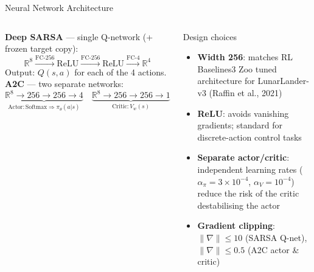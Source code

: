 \documentclass[aspectratio=169, 10pt]{beamer}
\begin{document}
\begin{frame}{Neural Network Architecture}
  \begin{columns}[T]
      \textbf{Deep SARSA} --- single Q-network (+ frozen target copy):
      \[
        \mathbb{R}^8 \xrightarrow{\text{FC-256}} \text{ReLU}
        \xrightarrow{\text{FC-256}} \text{ReLU}
        \xrightarrow{\text{FC-4}} \mathbb{R}^4
      \]
      Output: $Q(s, a)$ for each of the 4 actions.\\[0.8em]
      \textbf{A2C} --- two separate networks:
      \[
        \underbrace{\mathbb{R}^8 \!\to\! 256 \!\to\! 256 \!\to\! 4}_{\text{Actor}: \text{Softmax} \Rightarrow \pi_\theta(a|s)}
        \quad
        \underbrace{\mathbb{R}^8 \!\to\! 256 \!\to\! 256 \!\to\! 1}_{\text{Critic}: V_w(s)}
      \]
      \begin{block}{Design choices}
        \begin{itemize}
          \item \textbf{Width 256}: matches RL Baselines3 Zoo tuned
                architecture for LunarLander-v3 (Raffin et al., 2021)
          \item \textbf{ReLU}: avoids vanishing gradients; standard
                for discrete-action control tasks
          \item \textbf{Separate actor/critic}: independent learning
                rates ($\alpha_\pi = 3{\times}10^{-4}$,
                $\alpha_V = 10^{-4}$) reduce the risk of the critic
                destabilising the actor
          \item \textbf{Gradient clipping}: $\|\nabla\| \leq 10$
                (SARSA Q-net), $\|\nabla\| \leq 0.5$ (A2C actor \& critic)
        \end{itemize}
      \end{block}
  \end{columns}
\end{frame}
\end{document}
